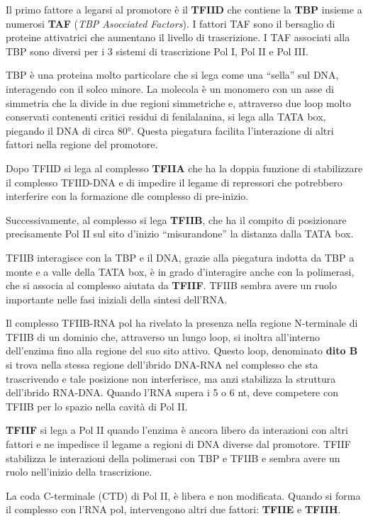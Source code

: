 \documentclass[11pt]{book}
\begin{document}
Il primo fattore a legarsi al promotore è il \textbf{TFIID} che contiene
la \textbf{TBP} insieme a numerosi \textbf{TAF} (\emph{TBP Asocciated
Factors}). I fattori TAF sono il bersaglio di proteine attivatrici che
aumentano il livello di trascrizione. I TAF associati alla TBP sono
diversi per i 3 sistemi di trascrizione Pol I, Pol II e Pol III.

TBP è una proteina molto particolare che si lega come una ``sella'' sul
DNA, interagendo con il solco minore. La molecola è un monomero con un
asse di simmetria che la divide in due regioni simmetriche e, attraverso
due loop molto conservati contenenti critici residui di fenilalanina, si
lega alla TATA box, piegando il DNA di circa 80°. Questa piegatura
facilita l'interazione di altri fattori nella regione del promotore.

Dopo TFIID si lega al complesso \textbf{TFIIA} che ha la doppia funzione
di stabilizzare il complesso TFIID-DNA e di impedire il legame di
repressori che potrebbero interferire con la formazione dle complesso di
pre-inizio.

Successivamente, al complesso si lega \textbf{TFIIB}, che ha il compito
di posizionare precisamente Pol II sul sito d'inizio ``misurandone'' la
distanza dalla TATA box.

TFIIB interagisce con la TBP e il DNA, grazie alla piegatura indotta da
TBP a monte e a valle della TATA box, è in grado d'interagire anche con
la polimerasi, che si associa al complesso aiutata da \textbf{TFIIF}.
TFIIB sembra avere un ruolo importante nelle fasi iniziali della sintesi
dell'RNA.

Il complesso TFIIB-RNA pol ha rivelato la presenza nella regione
N-terminale di TFIIB di un dominio che, attraverso un lungo loop, si
inoltra all'interno dell'enzima fino alla regione del suo sito attivo.
Questo loop, denominato \textbf{dito B} si trova nella stessa regione
dell'ibrido DNA-RNA nel complesso che sta trascrivendo e tale posizione
non interferisce, ma anzi stabilizza la struttura dell'ibrido RNA-DNA.
Quando l'RNA supera i 5 o 6 nt, deve competere con TFIIB per lo spazio
nella cavità di Pol II.

\textbf{TFIIF} si lega a Pol II quando l'enzima è ancora libero da
interazioni con altri fattori e ne impedisce il legame a regioni di DNA
diverse dal promotore. TFIIF stabilizza le interazioni della polimerasi
con TBP e TFIIB e sembra avere un ruolo nell'inizio della trascrizione.

La coda C-terminale (CTD) di Pol II, è libera e non modificata. Quando
si forma il complesso con l'RNA pol, intervengono altri due fattori:
\textbf{TFIIE} e \textbf{TFIIH}.
\end{document}
